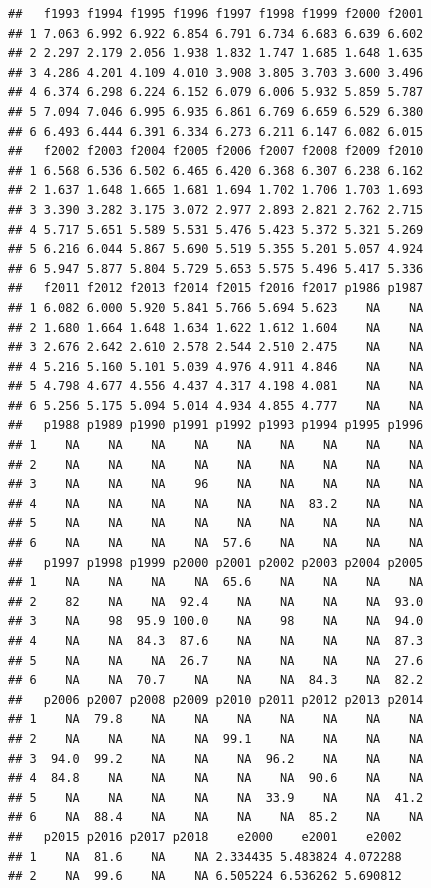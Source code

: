 \documentclass[
]{book}
\begin{document}
\begin{verbatim}
##   f1993 f1994 f1995 f1996 f1997 f1998 f1999 f2000 f2001
## 1 7.063 6.992 6.922 6.854 6.791 6.734 6.683 6.639 6.602
## 2 2.297 2.179 2.056 1.938 1.832 1.747 1.685 1.648 1.635
## 3 4.286 4.201 4.109 4.010 3.908 3.805 3.703 3.600 3.496
## 4 6.374 6.298 6.224 6.152 6.079 6.006 5.932 5.859 5.787
## 5 7.094 7.046 6.995 6.935 6.861 6.769 6.659 6.529 6.380
## 6 6.493 6.444 6.391 6.334 6.273 6.211 6.147 6.082 6.015
##   f2002 f2003 f2004 f2005 f2006 f2007 f2008 f2009 f2010
## 1 6.568 6.536 6.502 6.465 6.420 6.368 6.307 6.238 6.162
## 2 1.637 1.648 1.665 1.681 1.694 1.702 1.706 1.703 1.693
## 3 3.390 3.282 3.175 3.072 2.977 2.893 2.821 2.762 2.715
## 4 5.717 5.651 5.589 5.531 5.476 5.423 5.372 5.321 5.269
## 5 6.216 6.044 5.867 5.690 5.519 5.355 5.201 5.057 4.924
## 6 5.947 5.877 5.804 5.729 5.653 5.575 5.496 5.417 5.336
##   f2011 f2012 f2013 f2014 f2015 f2016 f2017 p1986 p1987
## 1 6.082 6.000 5.920 5.841 5.766 5.694 5.623    NA    NA
## 2 1.680 1.664 1.648 1.634 1.622 1.612 1.604    NA    NA
## 3 2.676 2.642 2.610 2.578 2.544 2.510 2.475    NA    NA
## 4 5.216 5.160 5.101 5.039 4.976 4.911 4.846    NA    NA
## 5 4.798 4.677 4.556 4.437 4.317 4.198 4.081    NA    NA
## 6 5.256 5.175 5.094 5.014 4.934 4.855 4.777    NA    NA
##   p1988 p1989 p1990 p1991 p1992 p1993 p1994 p1995 p1996
## 1    NA    NA    NA    NA    NA    NA    NA    NA    NA
## 2    NA    NA    NA    NA    NA    NA    NA    NA    NA
## 3    NA    NA    NA    96    NA    NA    NA    NA    NA
## 4    NA    NA    NA    NA    NA    NA  83.2    NA    NA
## 5    NA    NA    NA    NA    NA    NA    NA    NA    NA
## 6    NA    NA    NA    NA  57.6    NA    NA    NA    NA
##   p1997 p1998 p1999 p2000 p2001 p2002 p2003 p2004 p2005
## 1    NA    NA    NA    NA  65.6    NA    NA    NA    NA
## 2    82    NA    NA  92.4    NA    NA    NA    NA  93.0
## 3    NA    98  95.9 100.0    NA    98    NA    NA  94.0
## 4    NA    NA  84.3  87.6    NA    NA    NA    NA  87.3
## 5    NA    NA    NA  26.7    NA    NA    NA    NA  27.6
## 6    NA    NA  70.7    NA    NA    NA  84.3    NA  82.2
##   p2006 p2007 p2008 p2009 p2010 p2011 p2012 p2013 p2014
## 1    NA  79.8    NA    NA    NA    NA    NA    NA    NA
## 2    NA    NA    NA    NA  99.1    NA    NA    NA    NA
## 3  94.0  99.2    NA    NA    NA  96.2    NA    NA    NA
## 4  84.8    NA    NA    NA    NA    NA  90.6    NA    NA
## 5    NA    NA    NA    NA    NA  33.9    NA    NA  41.2
## 6    NA  88.4    NA    NA    NA    NA  85.2    NA    NA
##   p2015 p2016 p2017 p2018    e2000    e2001    e2002
## 1    NA  81.6    NA    NA 2.334435 5.483824 4.072288
## 2    NA  99.6    NA    NA 6.505224 6.536262 5.690812

\end{verbatim}
\end{document}
